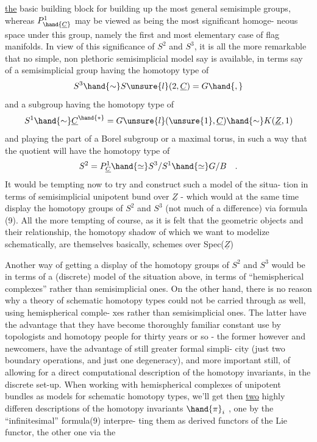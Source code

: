 
\uline{the} basic building block for building up the most general semisimple
groups,  whereas $P^{1}_{\hand{\underline{C}}}$ may be viewed as being the most significant homoge-%
neous space under this group,  namely the first and most elementary case
of flag manifolds.  In view of this significance of $S^2$ and $S^3$,  it is all
the more remarkable that no simple, non plethoric semisimplicial model
say is available,  in terms say of a semisimplicial group having the
homotopy type of 
\[ S^3 \hand{\sim} S\unsure{l}(2,\underline{C} )= G \hand{,} \]
and a subgroup having the homotopy type of
\[ S^1 \hand{\sim} \underline{C}^{\hand{*}} = G\unsure{l}(\unsure{1},\underline{C}) \hand{\sim} K(\underline{Z},1) \]
and playing the part of a Borel subgroup or a maximal torus,  in such a
way that the quotient will have the homotopy type of
\[ S^2 = P^1_{\underline{C}} \hand{\simeq} S^3/S^1 \hand{\simeq} G/B \quad . \]
It would be tempting now to try and construct such a model of the situa-%
tion in terms of semisimplicial unipotent bund over $\underline{Z}$  - which would
at the same time display the homotopy groups of $S^2$ and $S^3$ (not much of a
difference\hand{!}) via formula (9).  All the more tempting of course,  as it is
felt that the geometric objects and their relationship,  the homotopy
shadow of which we want to modelize  schematically,  are themselves
basically,  schemes over Spec($\underline{Z}$)\hand{!}

Another way of getting a display of the homotopy groups of $S^2$ and
$S^3$ would be in terms of a (discrete) model of the situation above,  in
terms of ``hemispherical complexes'' rather than semisimplicial ones.  On
the other hand,  there is no reason why a theory of schematic homotopy
types could not be carried through as well,  using hemispherical comple-%
xes rather than semisimplicial ones.  The latter  have the advantage 
that they have become   thoroughly familiar   constant use
by topologists and homotopy people for thirty years or so  -  the former
however and newcomers,  have the advantage of still greater formal simpli-%
city (just two boundary operations,  and just one degeneracy),  and more
important still,  of allowing for a direct computational description of
the homotopy invariants,  in the discrete set-up.  When working with
hemispherical complexes of unipotent bundles as models for schematic
homotopy types,  we'll get then \uline{two} highly differen descriptions of the
homotopy invariants $\hand{\pi}_i$ ,  one by the ``infinitesimal'' formula(9)  interpre-%
ting them as derived functors of the Lie functor,  the other one via the

